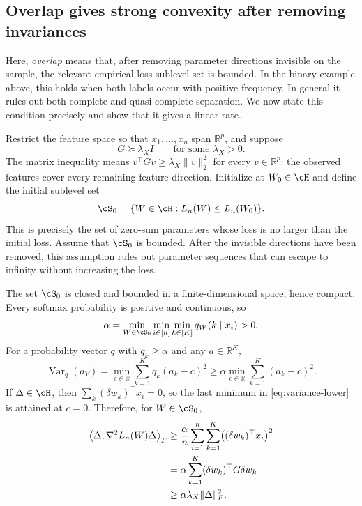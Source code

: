 \documentclass[11pt,twoside]{article}
\newcommand{\R}{\mathbb R}
\theoremstyle{definition}
\theoremstyle{remark}
\begin{document}
\subsection{Overlap gives strong convexity after removing invariances}
\label{sec:softmax-overlap}

Here, \emph{overlap} means that, after removing parameter directions invisible
on the sample, the relevant empirical-loss sublevel set is bounded. In the
binary example above, this holds when both labels occur with positive
frequency. In general it rules out both complete and quasi-complete
separation. We now state this condition precisely and show that it gives a
linear rate.

Restrict the feature space so that $x_1,\ldots,x_n$ span $\R^p$, and suppose
\begin{equation}
 G\succeq\lambda_X I
 \qquad\text{for some }\lambda_X>0.
 \label{eq:feature-coverage}
\end{equation}
The matrix inequality means
$v^\top Gv\ge\lambda_X\|v\|_2^2$ for every $v\in\R^p$: the observed features
cover every remaining feature direction. Initialize at $W_0\in\cH$ and define
the initial sublevel set
\begin{equation}
 \cS_0=\{W\in\cH:L_n(W)\le L_n(W_0)\}.
 \label{eq:initial-sublevel}
\end{equation}
This is precisely the set of zero-sum parameters whose loss is no larger than
the initial loss. Assume that $\cS_0$ is bounded. After the invisible
directions have been removed, this assumption rules out parameter sequences
that can escape to infinity without increasing the loss.

The set $\cS_0$ is closed and bounded in a finite-dimensional space, hence
compact. Every softmax probability is positive and continuous, so
\begin{equation}
 \alpha=\min_{W\in\cS_0}\min_{i\in[n]}\min_{k\in[K]}
 q_W(k\mid x_i)>0.
 \label{eq:sublevel-probability}
\end{equation}
For a probability vector $q$ with $q_k\ge\alpha$ and any $a\in\R^K$,
\begin{equation}
 \operatorname{Var}_q(a_Y)
 =\min_{c\in\R}\sum_{k=1}^Kq_k(a_k-c)^2
 \ge\alpha\min_{c\in\R}\sum_{k=1}^K(a_k-c)^2.
 \label{eq:variance-lower}
\end{equation}
If $\Delta\in\cH$, then
$\sum_k(\delta w_k)^\top x_i=0$, so the last minimum in
\cref{eq:variance-lower} is attained at $c=0$. Therefore, for
$W\in\cS_0$,
\begin{align}
 \left\langle\Delta,\nabla^2L_n(W)\Delta\right\rangle_F
 &\ge\frac\alpha n\sum_{i=1}^n\sum_{k=1}^K
       \bigl((\delta w_k)^\top x_i\bigr)^2\notag\\
 &=\alpha\sum_{k=1}^K(\delta w_k)^\top G\delta w_k\notag\\
 &\ge\alpha\lambda_X\|\Delta\|_F^2.
 \label{eq:restricted-curvature}
\end{align}
\end{document}
